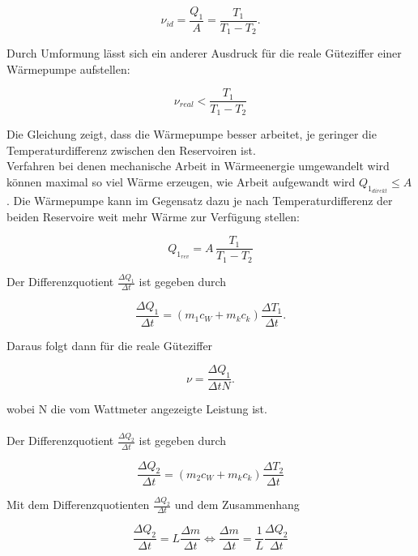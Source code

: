 \begin{equation}\label{eqn:guetezfferIdeal}
    ν_{id} = \frac{Q_1}{A} = \frac{T_1}{T_1 - T_2}.
\end{equation}

Durch Umformung lässt sich ein anderer Ausdruck für die reale Güteziffer einer Wärmepumpe aufstellen:

\begin{equation}\label{eqn:guetezifferReal}
    ν_{real} < \frac{T_1}{T_1 - T_2}
\end{equation}

Die Gleichung zeigt, dass die Wärmepumpe besser arbeitet, je geringer die Temperaturdifferenz zwischen den 
Reservoiren ist.\\
Verfahren bei denen mechanische Arbeit in Wärmeenergie umgewandelt wird können maximal so viel Wärme erzeugen,
wie Arbeit aufgewandt wird $Q_{1_{direkt}} \leq A$. 
Die Wärmepumpe kann im Gegensatz dazu je nach Temperaturdifferenz der beiden Reservoire weit mehr Wärme
zur Verfügung stellen:

\begin{equation}
    Q_{1_{rev}} = A\, \frac{T_1}{T_1 - T_2}
\end{equation}

Der Differenzquotient $\frac{ΔQ_1}{Δt}$ ist gegeben durch 

\begin{equation}
    \label{delQ1}
    \frac{ΔQ_1}{Δt} = \left(m_1c_W + m_kc_k\right)\frac{ΔT_1}{Δt}.
\end{equation}

Daraus folgt dann für die reale Güteziffer

\begin{equation}
    \label{vreal}
    ν = \frac{ΔQ_1}{ΔtN}.
\end{equation}

wobei N die vom Wattmeter angezeigte Leistung ist.\\
\\
Der Differenzquotient $\frac{ΔQ_2}{Δt}$ ist gegeben durch

\begin{equation}\label{eqn:diffQ2}
    \frac{ΔQ_2}{Δt} = \left(m_2c_W + m_kc_k\right)\frac{ΔT_2}{Δt}
\end{equation}

Mit dem Differenzquotienten $\frac{ΔQ_2}{Δt}$ und dem Zusammenhang

\begin{equation}\label{eqn:massendurchsatz}
    \frac{ΔQ_2}{Δt} = L\frac{Δm}{Δt} \Leftrightarrow \frac{Δm}{Δt} = \frac{1}{L}\frac{ΔQ_2}{Δt}
\end{equation}

